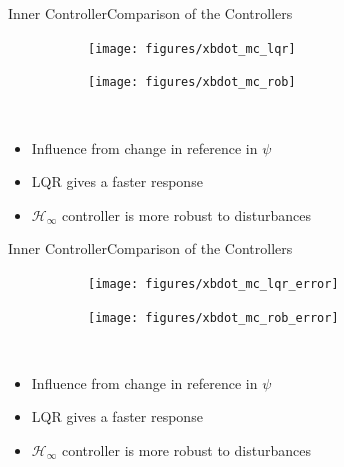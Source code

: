 \begin{frame}{Inner Controller}{Comparison of the Controllers}
\begin{figure}[H]
  \begin{minipage}{0.45\linewidth}
    \begin{figure}[H]
      \centering
      \texttt{[image: figures/xbdot\_mc\_lqr]}
    \end{figure}        
  \end{minipage}\hfill      
  \begin{minipage}{0.45\linewidth}
    \begin{figure}[H]
      \centering
      \texttt{[image: figures/xbdot\_mc\_rob]}
    \end{figure}                
  \end{minipage}\hfill \\
\end{figure}
\begin{itemize}
    \item Influence from change in reference in $\psi$
    \item LQR gives a faster response
    \item $\mathcal{H}_\infty$ controller is more robust to disturbances
\end{itemize}
\end{frame}


\begin{frame}{Inner Controller}{Comparison of the Controllers}
  \begin{figure}[H]
    \begin{minipage}{0.45\linewidth}
      \begin{figure}[H]
        \centering
        \texttt{[image: figures/xbdot\_mc\_lqr\_error]}
      \end{figure}        
    \end{minipage}\hfill      
    \begin{minipage}{0.45\linewidth}
      \begin{figure}[H]
        \centering
        \texttt{[image: figures/xbdot\_mc\_rob\_error]}
      \end{figure}                
    \end{minipage}\hfill \\
  \end{figure}
\begin{itemize}
  \item Influence from change in reference in $\psi$
  \item LQR gives a faster response
  \item $\mathcal{H}_\infty$ controller is more robust to disturbances
\end{itemize}
\end{frame}



